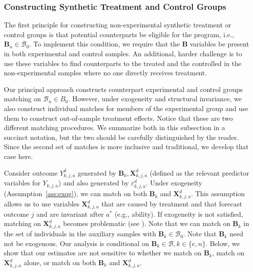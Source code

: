 \subsubsection{Constructing Synthetic Treatment and Control Groups}\label{appendix:match}

\noindent The first principle for constructing non-experimental synthetic treatment or control groups is that potential counterparts be eligible for the program, i.e., $\bm{B}_n \in \mathcal{B}_{0}$. To implement this condition, we require that the $\bm{B}$ variables be present in both experimental and control samples. An additional, harder challenge is to use these variables to find counterparts to the treated and the controlled in the non-experimental samples where no one directly receives treatment.

\noindent Our principal approach constructs counterpart experimental and control groups matching on $\mathcal{B}_n \in B_0$. However, under exogeneity and structural invariance, we also construct individual matches for members of the experimental group and use them to construct out-of-sample treatment effects. Notice that these are two different matching procedures. We summarize both in this subsection in a succinct notation, but the two should be carefully distinguished by the reader. Since the second set of matches is more inclusive and traditional, we develop that case here.

\noindent Consider outcome $Y^d_{k,j,a}$ generated by $\bm{B}_k, \bm{X}^d_{k,j,a}$ (defined as the relevant predictor variables for $Y_{k,j,a}$) and also generated by $\varepsilon^d_{k,j,a}$. Under exogeneity (Assumption~\ref{ass:exog}), we can match on both $\bm{B}_k$ and $\bm{X}^d_{k,j,a}$. This assumption allows us to  use variables $\bm{X}^d_{k,j,a}$ that are caused by treatment and that forecast outcome $j$ and are invariant after $a^\ast$ (e.g., ability). If exogeneity is not satisfied, matching on $\bm{X}^d_{k,j,a}$ becomes problematic (see \citealp{Heckman_Navarro_2004_REStat}). Note that we can match on $\bm{B}_k$ in the set of individuals in the auxiliary samples with $\bm{B}_k \in \mathcal{B}_{0}$. Note that $\bm{B}_k$ need not be exogenous. Our analysis is conditional on $\bm{B}_k \in \mathcal{B}, k \in \{e,n\}$. Below, we show that our estimates are not sensitive to whether we match on $\bm{B}_k$, match on $\bm{X}^d_{k,j,a}$ alone, or match on both $\bm{B}_k$ and $\bm{X}^d_{k,j,a}$.

